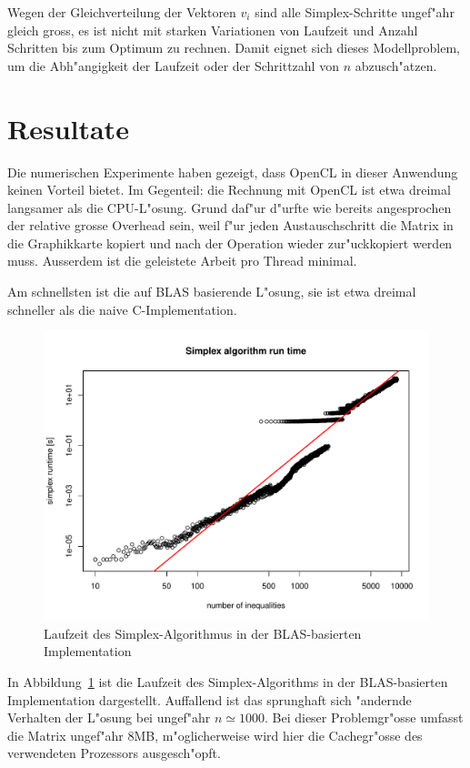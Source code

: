 Wegen der Gleichverteilung der Vektoren $v_i$
sind alle Simplex-Schritte ungef"ahr gleich
gross, es ist nicht mit starken Variationen von Laufzeit und
Anzahl Schritten bis zum Optimum zu rechnen. Damit eignet sich
dieses Modellproblem, um die Abh"angigkeit der Laufzeit oder
der Schrittzahl von $n$ abzusch"atzen.

\section{Resultate}
Die numerischen Experimente haben gezeigt, dass OpenCL in dieser Anwendung
keinen Vorteil bietet. Im Gegenteil: die Rechnung mit OpenCL ist
etwa dreimal langsamer als die CPU-L"osung. Grund daf"ur d"urfte
wie bereits angesprochen der relative grosse Overhead sein, weil f"ur
jeden Austauschschritt die Matrix in die Graphikkarte kopiert
und nach der Operation wieder zur"uckkopiert werden muss. Ausserdem
ist die geleistete Arbeit pro Thread minimal.

Am schnellsten ist die auf BLAS basierende L"osung, sie ist etwa dreimal
schneller als die naive C-Implementation.

\begin{figure}
\begin{center}
\includegraphics[width=\hsize]{add/runtime.pdf}
\end{center}
\caption{Laufzeit des Simplex-Algorithmus in der BLAS-basierten
Implementation\label{simplex:runtime}}
\end{figure}
In Abbildung~\ref{simplex:runtime} ist  die Laufzeit des Simplex-Algorithms
in der BLAS-basierten Implementation dargestellt.  Auffallend
ist das sprunghaft sich "andernde Verhalten der L"osung bei ungef"ahr
$n\simeq 1000$. Bei dieser Problemgr"osse umfasst die Matrix
ungef"ahr 8MB, m"oglicherweise wird hier die Cachegr"osse des
verwendeten Prozessors ausgesch"opft.

